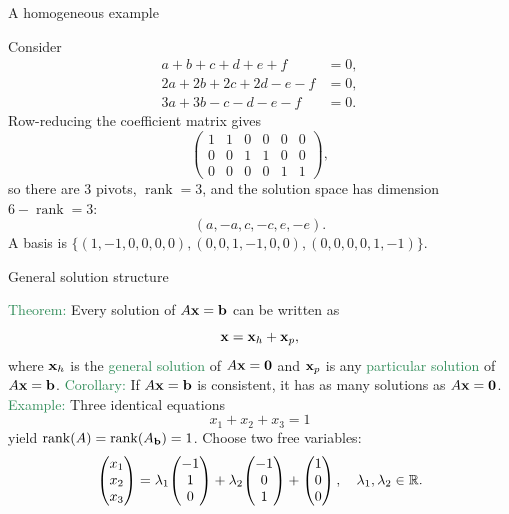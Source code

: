 \documentclass[11pt,aspectratio=169]{beamer}
\DeclareMathOperator{\rank}{rank}
\begin{document}
\begin{frame}{A homogeneous example}
 
Consider
\[
\begin{aligned}
a+b+c+d+e+f&=0,\\
2a+2b+2c+2d-e-f&=0,\\
3a+3b-c-d-e-f&=0.
\end{aligned}
\]
Row-reducing the coefficient matrix gives
\[
\begin{pmatrix}
1&1&0&0&0&0\\
0&0&1&1&0&0\\
0&0&0&0&1&1
\end{pmatrix},
\]
so there are $3$ pivots, $\rank=3$, and the solution space has dimension $6-\rank=3$:
\[
(a,-a,c,-c,e,-e).
\]
{\tiny A basis is $\{(1,-1,0,0,0,0),(0,0,1,-1,0,0),(0,0,0,0,1,-1)\}$.}
 
\end{frame}

\begin{frame}{General solution structure}
 
\textcolor{SeaGreen}{Theorem:} Every solution of $A{\bf x}={\bf b}$ can be written as
\[
{\bf x}={\bf x}_h+{\bf x}_p,
\]
where ${\bf x}_h$ is the \textcolor{SeaGreen}{general solution} of $A{\bf x}={\bf 0}$ and ${\bf x}_p$ is any \textcolor{SeaGreen}{particular solution} of $A{\bf x}={\bf b}$.
\vskip 6pt
\textcolor{SeaGreen}{Corollary:} If $A{\bf x}={\bf b}$ is consistent, it has as many solutions as $A{\bf x}={\bf 0}$.
\vskip 6pt
\textcolor{SeaGreen}{Example:} Three identical equations
\[
x_1+x_2+x_3=1
\]
yield $\rank(A)=\rank(A_{\bf b})=1$. Choose two free variables:
\[
\begin{pmatrix}x_1\\x_2\\x_3\end{pmatrix}
=\lambda_1\!\begin{pmatrix}-1\\1\\0\end{pmatrix}
+\lambda_2\!\begin{pmatrix}-1\\0\\1\end{pmatrix}
+\begin{pmatrix}1\\0\\0\end{pmatrix},\quad \lambda_1,\lambda_2\in\mathbb R.
\]
\end{frame}
\end{document}
